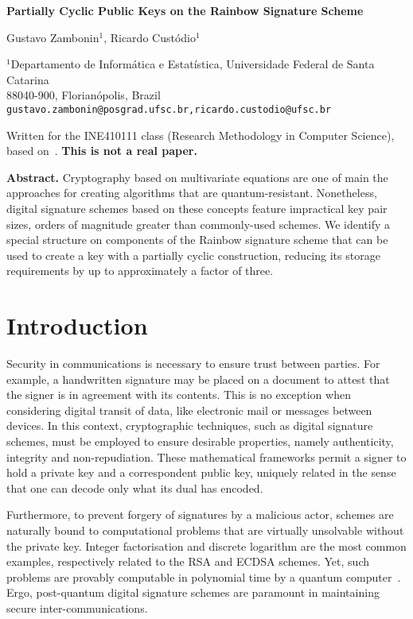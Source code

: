 \documentclass[a4paper, 14pt]{extarticle}
\begin{document}
\begin{center}
    {\Large\bf Partially Cyclic Public Keys on the Rainbow Signature Scheme} \vspace{.75cm}
    
    Gustavo Zambonin$^{1}$, Ricardo Custódio$^{1}$
    
    $^{1}$Departamento de Informática e Estatística, Universidade Federal de Santa Catarina \\
    88040-900, Florianópolis, Brazil \\
    \texttt{gustavo.zambonin@posgrad.ufsc.br,ricardo.custodio@ufsc.br}
    
     Written for the INE410111 class (Research Methodology in Computer Science), based on~\cite{Petzoldt:phd:2013:jul}. \textbf{This is not a real paper.} \vspace{.75cm}
\end{center}

\textbf{Abstract.} Cryptography based on multivariate equations are one of main the approaches for creating algorithms that are quantum-resistant. Nonetheless, digital signature schemes based on these concepts feature impractical key pair sizes, orders of magnitude greater than commonly-used schemes. We identify a special structure on components of the Rainbow signature scheme that can be used to create a key with a partially cyclic construction, reducing its storage requirements by up to approximately a factor of three.

\section{Introduction}\label{sec:intro}

Security in communications is necessary to ensure trust between parties. For example, a handwritten signature may be placed on a document to attest that the signer is in agreement with its contents. This is no exception when considering digital transit of data, like electronic mail or messages between devices. In this context, cryptographic techniques, such as digital signature schemes, must be employed to ensure desirable properties, namely authenticity, integrity and non-repudiation. These mathematical frameworks permit a signer to hold a private key and a correspondent public key, uniquely related in the sense that one can decode only what its dual has encoded. 

Furthermore, to prevent forgery of signatures by a malicious actor, schemes are naturally bound to computational problems that are virtually unsolvable without the private key. Integer factorisation and discrete logarithm are the most common examples, respectively related to the RSA and ECDSA schemes. Yet, such problems are provably computable in polynomial time by a quantum computer~\cite{Shor:article:1997:oct}. Ergo, post-quantum digital signature schemes are paramount in maintaining secure inter-communications.
\end{document}
